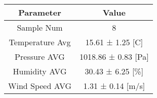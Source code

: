 \begin{longtable*}{|c|c|}\hline
{}
Parameter&Value\\\hline\hline
{}Sample Num&8\\\hline
{}Temperature Avg&15.61 ± 1.25 [C]\\\hline
{}Pressure AVG&1018.86 ± 0.83 [Pa]\\\hline
{}Humidity AVG&30.43 ± 6.25 [\%]\\\hline
{}Wind Speed AVG&1.31 ± 0.14 [m/s]\\\hline
\end{longtable*}
